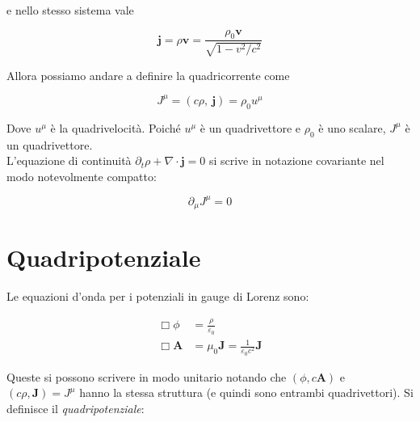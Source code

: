 e nello stesso sistema vale 

\begin{tcolorbox}[colback=yellow!10!white, colframe=orange!70!black, boxrule=0.8pt]
\begin{equation}
    \mathbf{j} = \rho \mathbf{v} = \frac{\rho_0 \mathbf{v}}{\sqrt{1 - v^2/c^2}}
\end{equation}
\end{tcolorbox}

Allora possiamo andare a definire la quadricorrente come

\begin{tcolorbox}[colback=yellow!10!white, colframe=orange!70!black, boxrule=0.8pt]
\begin{equation}
    J^{\mu} = (c \rho, \ \mathbf{j}) = \rho_0 u^{\mu}
\end{equation}
\end{tcolorbox}

Dove $u^{\mu}$ è la quadrivelocità. Poiché $u^{\mu}$ è un quadrivettore e $\rho_0$ è uno scalare, $J^{\mu}$ è un quadrivettore. \\

L'equazione di continuità $\partial_t\rho + \nabla\cdot\mathbf{j} = 0$ si scrive in notazione covariante nel modo notevolmente compatto:

\begin{tcolorbox}[colback=yellow!10!white, colframe=orange!70!black, boxrule=0.8pt]
\begin{equation}\label{eq: continuita_covariante}
    \partial_\mu J^\mu = 0
\end{equation}
\end{tcolorbox}

\section{Quadripotenziale}

Le equazioni d'onda per i potenziali in gauge di Lorenz sono:

\begin{align}
    \Box\phi &= \frac{\rho}{\varepsilon_0} \\
    \Box\mathbf{A} &= \mu_0\mathbf{J} = \frac{1}{\varepsilon_0 c^2} \mathbf{J}
\end{align}

Queste si possono scrivere in modo unitario notando che $(\phi, c\mathbf{A})$ e $(c\rho, \mathbf{J}) = J^\mu$ hanno la stessa struttura (e quindi sono entrambi quadrivettori). Si definisce il \emph{quadripotenziale}:


